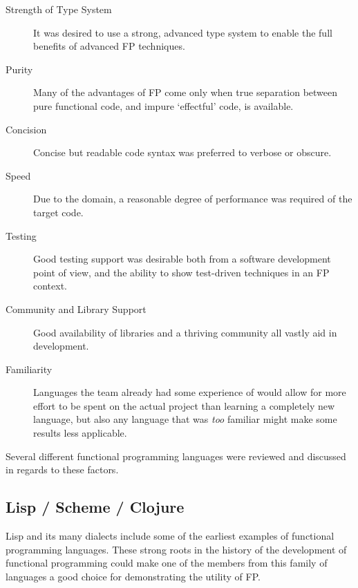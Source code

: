 \begin{description}
	\item[Strength of Type System] It was desired to use a strong, advanced type system to enable the full benefits of advanced FP techniques.
	\item[Purity] Many of the advantages of FP come only when true separation between pure functional code, and impure `effectful' code, is available.\cite[-10em]{hudak1989conception}
	\item[Concision] Concise but readable code syntax was preferred to verbose or obscure.
	\item[Speed] Due to the domain, a reasonable degree of performance was required of the target code.
	\item[Testing] Good testing support was desirable both from a software development point of view, and the ability to show test-driven techniques in an FP context.
	\item[Community and Library Support] Good availability of libraries and a thriving community all vastly aid in development.
	\item[Familiarity] Languages the team already had some experience of would allow for more effort to be spent on the actual project than learning a completely new language, but also any language that was \emph{too} familiar might make some results less applicable.
\end{description}
\noindent
Several different functional programming languages were reviewed and discussed in regards to these factors.

\subsection{Lisp / Scheme / Clojure}




Lisp and its many dialects include some of the earliest examples of functional programming languages. These strong roots in the history of the development of functional programming could make one of the members from this family of languages a good choice for demonstrating the utility of FP.

